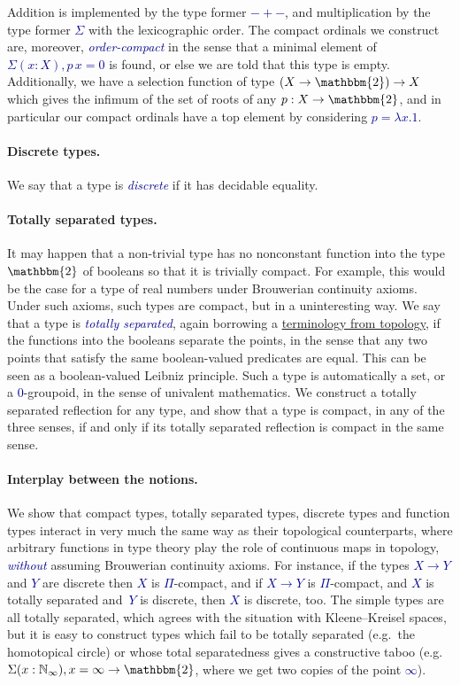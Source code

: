 \documentclass[a4paper]{easychair}
\newcommand{\db}{\textcolor{darkblue}}
\newcommand{\df}[1]{\emph{\db{#1}}}
\newcommand{\m}[1]{\db{$#1$}}
\newcommand{\N}{\mathbb{N}}
\newcommand{\NI}{\N_\infty}
\newcommand{\Two}{\mathbbm{2}}
\begin{document}
Addition is implemented by the type former \m{-+-}, and multiplication
by the type former \m{\Sigma} with the lexicographic order. The
compact ordinals we construct are, moreover, \df{order-compact} in the
sense that a minimal element of \m{\Sigma (x : X), p\,x = 0} is found,
or else we are told that this type is empty.  Additionally, we have a
selection function of type \m{(X \to \Two) \to X} which gives the
infimum of the set of roots of any \m{p : X \to \Two}, and in
particular our compact ordinals have a top element by considering \m{p
  = \lambda x. 1}.

\paragraph{Discrete types.}
We say that a type is \df{discrete} if it has decidable equality.

\paragraph{Totally separated types.}
It may happen that a non-trivial type has no nonconstant function into
the type \m{\Two} of booleans so that it is trivially compact. For
example, this would be the case for a type of real numbers
under Brouwerian continuity axioms. Under such axioms, such types are
compact, but in a uninteresting way. We say that a type is \df{totally
  separated}, again borrowing a
\href{https://www.encyclopediaofmath.org/index.php/Totally_separated_space}{terminology
  from topology}, if the functions into the booleans separate the
points, in the sense that any two points that satisfy the same boolean-valued
predicates are equal. This can be seen as a boolean-valued Leibniz principle. Such a type is automatically a set, or a
\m{0}-groupoid, in the sense of univalent mathematics. We construct a
totally separated reflection for any type, and show that a type is
compact, in any of the three senses, if and only if its totally
separated reflection is compact in the same sense.

\paragraph{Interplay between the notions.}
We show that compact types, totally separated types, discrete types
and function types interact in very much the same way as their
topological counterparts, where arbitrary functions in
type theory play the role of continuous maps in topology, \df{without}
assuming Brouwerian continuity axioms. For instance, if the types \m{X
  \to Y} and \m{Y} are discrete then \m{X} is \m{\Pi}-compact, and if
\m{X \to Y} is \m{\Pi}-compact, and \m{X} is totally separated
and~\m{Y} is discrete, then \m{X} is discrete, too. The simple types
are all totally separated, which agrees with the situation with
Kleene--Kreisel spaces, but it is easy to construct types which fail
to be totally separated (e.g.\ the homotopical circle) or whose total
separatedness gives a constructive taboo (e.g.\ \m{\Sigma (x : \NI), x =
  \infty \to \Two}, where we get two copies of the point \m{\infty}).
\end{document}
